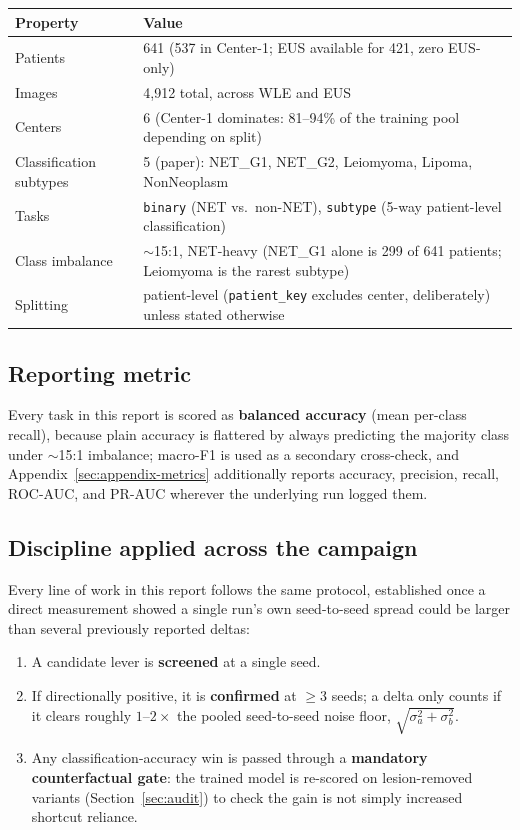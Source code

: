 \documentclass[10pt]{article}
\begin{document}
\begin{center}
\begin{tabular}{lL{10.5cm}}
\toprule
\textbf{Property} & \textbf{Value} \\
\midrule
Patients & 641 (537 in Center-1; EUS available for 421, zero EUS-only) \\
Images & 4{,}912 total, across WLE and EUS \\
Centers & 6 (Center-1 dominates: 81--94\% of the training pool depending on split) \\
Classification subtypes & 5 (paper): NET\_G1, NET\_G2, Leiomyoma, Lipoma, NonNeoplasm \\
Tasks & \texttt{binary} (NET vs.\ non-NET), \texttt{subtype} (5-way patient-level classification) \\
Class imbalance & $\sim$15:1, NET-heavy (NET\_G1 alone is 299 of 641 patients; Leiomyoma is the rarest subtype) \\
Splitting & patient-level (\texttt{patient\_key} excludes center, deliberately) unless stated otherwise \\
\bottomrule
\end{tabular}
\end{center}

\subsection{Reporting metric}

Every task in this report is scored as \textbf{balanced accuracy} (mean per-class recall), because plain
accuracy is flattered by always predicting the majority class under $\sim$15:1 imbalance; macro-F1 is used
as a secondary cross-check, and Appendix~\ref{sec:appendix-metrics} additionally reports accuracy,
precision, recall, ROC-AUC, and PR-AUC wherever the underlying run logged them.

\subsection{Discipline applied across the campaign}

Every line of work in this report follows the same protocol, established once a direct measurement showed
a single run's own seed-to-seed spread could be larger than several previously reported deltas:

\begin{enumerate}[nosep]
  \item A candidate lever is \textbf{screened} at a single seed.
  \item If directionally positive, it is \textbf{confirmed} at $\geq$3 seeds; a delta only counts if it
    clears roughly $1$--$2\times$ the pooled seed-to-seed noise floor, $\sqrt{\sigma_a^2+\sigma_b^2}$.
  \item Any classification-accuracy win is passed through a \textbf{mandatory counterfactual gate}: the
    trained model is re-scored on lesion-removed variants (Section~\ref{sec:audit}) to check the gain is
    not simply increased shortcut reliance.
\end{enumerate}
\end{document}
